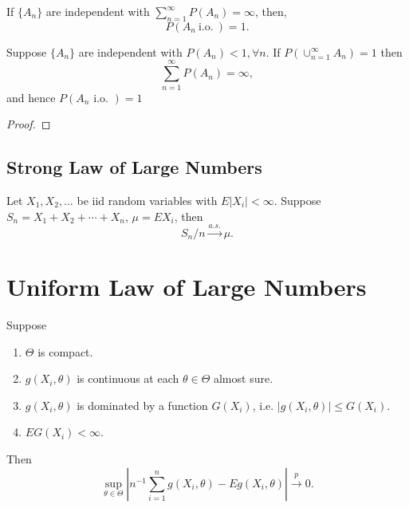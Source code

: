 \begin{lemma}
	If \(\{A_n\}\) are independent with \(\sum_{n=1}^{\infty}P\left(A_{n}\right)=\infty\), then,
	\begin{equation}
		P\left(A_{n}\ \text{i.o.}\ \right)=1.
	\end{equation}
\end{lemma}

\begin{corollary}
	Suppose \(\{A_{n}\}\) are independent with \(P\left(A_{n}\right)<1,\forall n\). If \(P\left(\cup_{n=1}^{\infty}A_{n}\right)=1\) then
	\begin{equation}
		\sum_{n=1}^{\infty}P\left(A_{n}\right)=\infty,
	\end{equation}
	and hence \(P\left(A_{n}\text{ i.o. }\right)=1\)
\end{corollary}

\begin{proof}

\end{proof}

\subsection{Strong Law of Large Numbers}

\begin{theorem}\label{thm:SLLN}
	Let \(X_1,X_2,\ldots\) be iid random variables with \(E|X_i|<\infty\). Suppose \(S_n=X_1+X_2+\cdots+X_n\), \(\mu=EX_i\), then
	\begin{equation}
		S_n/n\stackrel{a.s.}{\rightarrow}\mu.
	\end{equation}
\end{theorem}

\section{Uniform Law of Large Numbers}

\begin{theorem}\label{thm:ULLN}
	Suppose
	\begin{enumerate}
		\item \(\Theta\) is compact.
		\item \(g\left(X_{i},\theta\right)\) is continuous at each \(\theta\in\Theta\) almost sure.
		\item \(g\left(X_{i},\theta\right)\) is dominated by a function \(G\left(X_{i}\right)\), i.e. \(\left|g\left(X_{i},\theta\right)\right|\leq G\left(X_{i}\right)\).
		\item \(EG\left(X_{i}\right)<\infty\).
	\end{enumerate}
	Then
	\begin{equation}
		\sup_{\theta\in\Theta}\left|n^{-1}\sum_{i=1}^{n}g\left(X_{i},\theta\right)-Eg\left(X_{i},\theta\right)\right|\stackrel{p}{\rightarrow}0.
	\end{equation}
\end{theorem}

